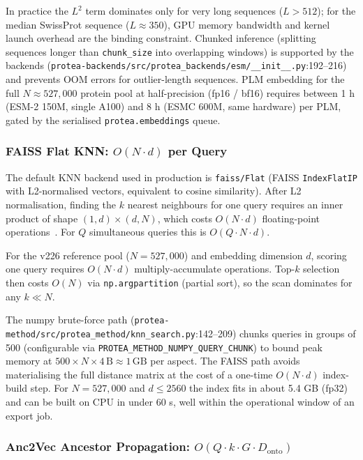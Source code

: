 In practice the $L^2$ term dominates only for very long sequences
($L > 512$); for the median SwissProt sequence ($L \approx 350$), GPU
memory bandwidth and kernel launch overhead are the binding constraint.
Chunked inference (splitting sequences longer than \texttt{chunk\_size}
into overlapping windows) is supported by the backends
(\texttt{protea-backends/src/protea\_backends/esm/\_\_init\_\_.py}:192--216)
and prevents OOM errors for outlier-length sequences.
PLM embedding for the full $N \approx 527{,}000$ protein pool at
half-precision (fp16 / bf16) requires between 1 h (ESM-2 150M, single A100)
and 8 h (ESMC 600M, same hardware) per PLM, gated by the serialised
\texttt{protea.embeddings} queue.

\subsubsection{FAISS Flat KNN: $O(N \cdot d)$ per Query}
\label{sssec:faiss-knn}

The default KNN backend used in production is \texttt{faiss/Flat}
(FAISS \texttt{IndexFlatIP} with L2-normalised vectors, equivalent to
cosine similarity). After L2 normalisation, finding the $k$ nearest
neighbours for one query requires an inner product of shape
$(1, d) \times (d, N)$, which costs $O(N \cdot d)$ floating-point
operations~\cite{johnson2021faiss}. For $Q$ simultaneous queries this
is $O(Q \cdot N \cdot d)$.

\begin{definition}
  For the v226 reference pool ($N = 527{,}000$) and embedding dimension $d$,
  scoring one query requires $O(N \cdot d)$ multiply-accumulate operations.
  Top-$k$ selection then costs $O(N)$ via \texttt{np.argpartition} (partial
  sort), so the scan dominates for any $k \ll N$.
\end{definition}

The numpy brute-force path (\texttt{protea-method/src/protea\_method/knn\_search.py}:142--209)
chunks queries in groups of 500 (configurable via
\texttt{PROTEA\_METHOD\_NUMPY\_QUERY\_CHUNK}) to bound peak memory at
$500 \times N \times 4\,\mathrm{B} \approx 1\,\mathrm{GB}$ per aspect.
The FAISS path avoids materialising the full distance matrix at the cost
of a one-time $O(N \cdot d)$ index-build step. For $N = 527{,}000$ and
$d \leq 2560$ the index fits in about 5.4 GB (fp32) and can be built on CPU
in under 60 s, well within the operational window of an export job.

\subsubsection{Anc2Vec Ancestor Propagation: $O(Q \cdot k \cdot G \cdot D_{\text{onto}})$}
\label{sssec:anc2vec}

